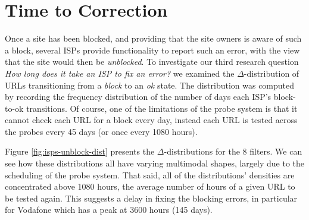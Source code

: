 \documentclass{bmcart}
\begin{document}
\section*{Time to Correction}
Once a site has been blocked, and providing that the site owners is aware of such a block, several ISPs provide functionality to report such an error, with the view that the site would then be \textit{unblocked}.
To investigate our third research question \textit{How long does it take an ISP to fix an error?} we examined the $\Delta$-distribution of URLs transitioning from a \textit{block} to an \textit{ok} state.
The distribution was computed by recording the frequency distribution of the number of days each ISP's block-to-ok transitions.
Of course, one of the limitations of the probe system is that it cannot check each URL for a block every day, instead each URL is tested across the probes every 45 days (or once every 1080 hours).

Figure \ref{fig:isps-unblock-dist} presents the $\Delta$-distributions for the 8 filters.
We can see how these distributions all have varying multimodal shapes, largely due to the scheduling of the probe system.
That said, all of the distributions' densities are concentrated above 1080 hours, the average number of hours of a given URL to be tested again.
This suggests a delay in fixing the blocking errors, in particular for Vodafone which has a peak at 3600 hours (145 days).
\end{document}
